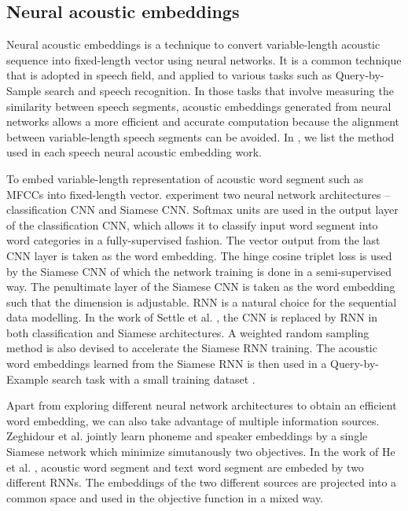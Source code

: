 \subsection{Neural acoustic embeddings}

Neural acoustic embeddings is a technique to convert variable-length acoustic sequence into fixed-length vector using neural networks. It is a common technique that is adopted in speech field, and applied to various tasks such as Query-by-Sample search and speech recognition. In those tasks that involve measuring the similarity between speech segments, acoustic embeddings generated from neural networks allows a more efficient and accurate computation because the alignment between variable-length speech segments can be avoided. In , we list the method used in each speech neural acoustic embedding work.

To embed variable-length representation of acoustic word segment such as \gls{MFCC}s into fixed-length vector.  experiment two neural network architectures -- classification \gls{CNN} and Siamese \gls{CNN}. Softmax units are used in the output layer of the classification \gls{CNN}, which allows it to classify input word segment into word categories in a fully-supervised fashion. The vector output from the last \gls{CNN} layer is taken as the word embedding. The hinge cosine triplet loss is used by the Siamese \gls{CNN} of which the network training is done in a semi-supervised way. The penultimate layer of the Siamese \gls{CNN} is taken as the word embedding such that the dimension is adjustable. \gls{RNN} is a natural choice for the sequential data modelling. In the work of Settle et al. , the \gls{CNN} is replaced by \gls{RNN} in both classification and Siamese architectures. A weighted random sampling method is also devised to accelerate the Siamese \gls{RNN} training. The acoustic word embeddings learned from the Siamese \gls{RNN} is then used in a Query-by-Example search task with a small training dataset .

Apart from exploring different neural network architectures to obtain an efficient word embedding, we can also take advantage of multiple information sources. Zeghidour et al.  jointly learn phoneme and speaker embeddings by a single Siamese network which minimize simutanously two objectives. In the work of He et al. , acoustic word segment and text word segment are embeded by two different \gls{RNN}s. The embeddings of the two different sources are projected into a common space and used in the objective function in a mixed way. 

